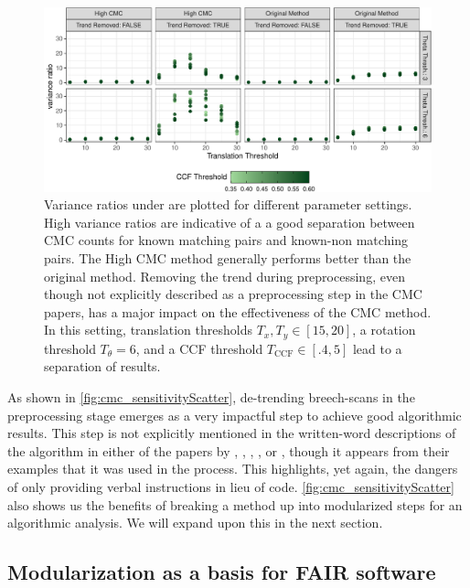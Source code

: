 \begin{Schunk}
\begin{figure}[htbp]

\includegraphics[width=\textwidth]{figures/cmcr-unnamed-chunk-20-1} \hfill{}

\caption{\label{fig:cmc_sensitivityScatter} Variance ratios under are plotted for different parameter settings. High variance ratios are indicative of a a good separation between CMC counts for known matching pairs and known-non matching pairs. The High CMC method generally performs better than the original method. Removing the trend during preprocessing, even though not explicitly described as a preprocessing step in the CMC papers, has a major impact on the effectiveness of the CMC method. In this setting, translation thresholds $T_x, T_y \in [15,20]$, a rotation threshold $T_\theta = 6$, and a CCF threshold $T_{\text{CCF}} \in [.4,5]$ lead to a separation of results. }\label{fig:unnamed-chunk-20}
\end{figure}
\end{Schunk}

As shown in \autoref{fig:cmc_sensitivityScatter}, de-trending
breech-scans in the preprocessing stage emerges as a very impactful step
to achieve good algorithmic results. This step is not explicitly
mentioned in the written-word descriptions of the algorithm in either of
the papers by \citet{song_proposed_2013}, \citet{tong_fired_2014},
\citet{tong_improved_2015}, \citet{chen_convergence_2017}, or
\citet{song_estimating_2018}, though it appears from their examples that
it was used in the process. This highlights, yet again, the dangers of
only providing verbal instructions in lieu of code.
\autoref{fig:cmc_sensitivityScatter} also shows us the benefits of
breaking a method up into modularized steps for an algorithmic analysis.
We will expand upon this in the next section.

\hypertarget{exploring}{%
\subsection{Modularization as a basis for FAIR
software}\label{exploring}}

